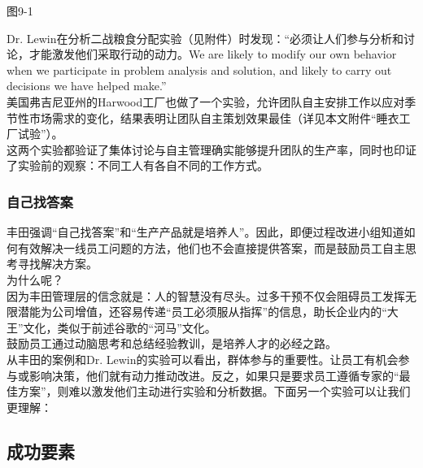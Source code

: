 图9-1

Dr.
Lewin在分析二战粮食分配实验（见附件）时发现：``必须让人们参与分析和讨论，才能激发他们采取行动的动力。We
are likely to modify our own behavior when we participate in problem
analysis and solution, and likely to carry out decisions we have helped
make.''\\
美国弗吉尼亚州的Harwood工厂也做了一个实验，允许团队自主安排工作以应对季节性市场需求的变化，结果表明让团队自主策划效果最佳（详见本文附件``睡衣工厂试验''）。\\
这两个实验都验证了集体讨论与自主管理确实能够提升团队的生产率，同时也印证了实验前的观察：不同工人有各自不同的工作方式。\\

\hypertarget{ux81eaux5df1ux627eux7b54ux6848}{%
\subsubsection{自己找答案}\label{ux81eaux5df1ux627eux7b54ux6848}}

丰田强调``自己找答案''和``生产产品就是培养人''。因此，即便过程改进小组知道如何有效解决一线员工问题的方法，他们也不会直接提供答案，而是鼓励员工自主思考寻找解决方案。\\
为什么呢？\\
因为丰田管理层的信念就是：人的智慧没有尽头。过多干预不仅会阻碍员工发挥无限潜能为公司增值，还容易传递``员工必须服从指挥''的信息，助长企业内的``大王''文化，类似于前述谷歌的``河马''文化。\\
鼓励员工通过动脑思考和总结经验教训，是培养人才的必经之路。\\
从丰田的案例和Dr.
Lewin的实验可以看出，群体参与的重要性。让员工有机会参与或影响决策，他们就有动力推动改进。反之，如果只是要求员工遵循专家的``最佳方案''，则难以激发他们主动进行实验和分析数据。下面另一个实验可以让我们更理解：


\hypertarget{ux6210ux529fux8981ux7d20}{%
\subsection{成功要素}\label{ux6210ux529fux8981ux7d20}}


